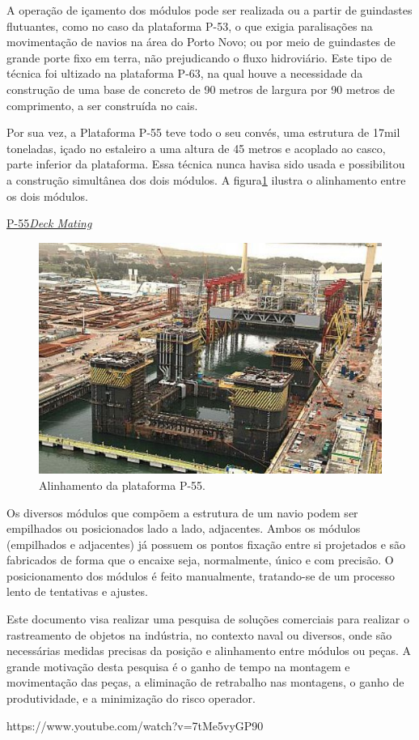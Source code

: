 A operação de içamento dos módulos pode ser realizada ou a partir de guindastes
flutuantes, como no caso da plataforma P-53, o que exigia paralisações 
na movimentação de navios na área do Porto Novo; ou por meio de guindastes de
grande porte fixo em terra, não prejudicando o fluxo hidroviário. Este tipo de
técnica foi ultizado na plataforma P-63, na qual houve a necessidade da
construção de uma base de concreto de 90 metros de largura por 90 metros de
comprimento, a ser construída no cais.

Por sua vez, a Plataforma P-55 teve todo o seu convés, uma estrutura de 17mil
toneladas, içado no estaleiro a uma altura de 45 metros e acoplado ao casco,
parte inferior da plataforma. Essa técnica nunca havisa sido usada e
possibilitou a construção simultânea dos dois módulos. A figura\ref{P55} ilustra
o alinhamento entre os dois módulos.

\href{http://www.offshoreenergytoday.com/brazils-petrobras-completes-deck-mating-on-p-55-platform/}{P-55\textit{Deck
Mating}}

\begin{figure}[h!]
    \centering
    \includegraphics[width=0.9\columnwidth]{figs/mating/P55}
    \caption{Alinhamento da plataforma P-55.}
    \label{P55}
\end{figure} 

Os diversos módulos que compõem a estrutura de um navio podem ser empilhados ou
posicionados lado a lado, adjacentes. Ambos os módulos (empilhados
e adjacentes) já possuem os pontos fixação entre si projetados e são fabricados
de forma que o encaixe seja, normalmente, único e com precisão. O posicionamento
dos módulos é feito manualmente, tratando-se de um processo lento de tentativas
e ajustes. 

Este documento visa realizar uma pesquisa de soluções comerciais para realizar o
rastreamento de objetos na indústria, no contexto naval ou diversos, onde
são necessárias medidas precisas da posição e alinhamento entre módulos ou
peças. A grande motivação desta pesquisa é o ganho de tempo na montagem e
movimentação das peças, a eliminação de retrabalho nas montagens, o ganho de produtividade, e a minimização do risco operador.

https://www.youtube.com/watch?v=7tMe5vyGP90